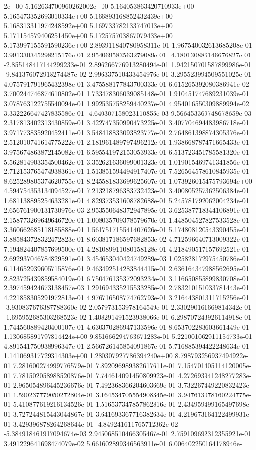 2e+00	5.162634700960262002e+00	5.164053863420710933e+00	5.165473352693010334e+00	5.166893168852432439e+00	5.168313311974248592e+00	5.169733782133747013e+00	5.171154579406251450e+00	5.172575703867079433e+00	5.173997155591590236e+00
2.893911840780958311e-01	1.967540032613685208e-01	3.991330345298215176e-01	2.954069583563279089e-01	-4.180130886146676827e-01	-2.855148417144299233e-01	2.896266776913280494e-01	1.942150701587899986e-01	-9.841376072918274487e-02	2.996337510433454976e-01	3.295523994509551025e-01	4.075791791965432398e-01	3.475588177843700333e-01	6.615265392080386941e-02	3.700244746874610802e-01	1.733478306039085148e-01	1.910451747689231039e-01	3.078763122755540094e-01	1.992535758259440237e-01	4.954016550309889994e-02	3.332226647427835586e-01	-4.640307158023110855e-03	9.566453369748678659e-03	2.317813402313430859e-01	3.422747350990473225e-01	3.407704694483986718e-01	3.971773835920452411e-01	3.548418833093823777e-01	2.764861398874305376e-01	2.512010741614775222e-01	2.181961489797496212e-01	1.938668787471665433e-01	3.975674863872145082e-01	6.595541972153053933e-01	6.513723451785581320e-01	5.562814903354500462e-01	3.352621636099001323e-01	1.019015469741341856e-01	2.712153765474938361e-01	1.513851594494917407e-01	7.526564578610845935e-01	8.625289805374620755e-01	8.245581833699625607e-01	1.073926015475793694e+00	4.594754353134094527e-01	7.213218796383732423e-01	3.400805257362506384e-01	1.681138895254633281e-01	4.829373531608782688e-01	5.245781792062004234e-01	2.656761900131730976e-03	2.953550648372947895e-01	3.625387718344106891e-01	2.158773269649646720e-01	1.008035709378579670e-01	1.448504527827533528e-01	3.360662685118185888e-01	1.561751715541407626e-01	5.174808120543390455e-01	3.885843728322472823e-01	8.603817186597682853e-02	4.712596640713009322e-01	7.194824407857699500e-01	4.281089911080158128e-01	4.218490517157692521e-01	2.692937046784829591e-01	3.454653040424749289e-03	1.025828172975450786e-01	6.114652939605715876e-01	9.463492514283844415e-01	2.636164347988562695e-01	2.823725439859584019e-01	6.750476135372093234e-01	3.116650855899830708e-01	2.397459424673138457e-03	1.291694335215533285e-01	2.783210151033781443e-01	4.221858305291972813e-01	4.976716508774762793e-01	3.216443801311715256e-01	-3.930837676387788360e-02	2.057973153978164549e-01	2.330290161669814342e-01	-1.695952685303268523e-02	1.408291491523938066e-01	6.298707243926114918e-01	1.744560889420400107e-01	4.630370286947133596e-01	8.653702283603661449e-01	1.130685891797814424e+00	9.851666294763671283e-01	5.221001062911154733e-01	4.891541750938996347e-01	2.566726145854091867e-01	5.716885394422248634e-01	1.141069317729314303e+00	1.280307927786394240e+00	8.798793256937494922e-01	7.281600274999776579e-01	7.892096989382617611e-01	7.154701405114120005e-01	7.781502058988520876e-01	7.744614091450809923e-01	4.272693941248277283e-01	2.965054896445236676e-01	7.492368366204603669e-01	3.732267449220832423e-01	1.590237779050272804e-01	3.164534705554908345e-01	3.947613078160224775e-01	5.410877619216134526e-01	1.516537347857862816e-01	2.434959499165497698e-01	3.727244815443044867e-01	3.641693367716382634e-01	4.219673164122499931e-01	3.429396878264268644e-01	-4.849241611765712362e-02	-5.384918461917094674e-03	2.945068510466305467e-01	2.759109692312355921e-01	3.491229641698474079e-02	5.661602899346563911e-01	6.006402250164178946e-